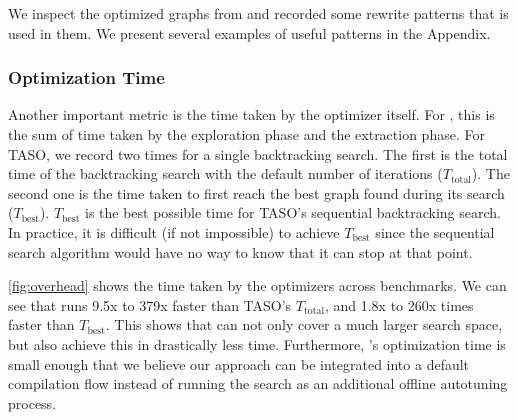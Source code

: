 We inspect the optimized graphs from \ourname{} and recorded some rewrite patterns that is used in them.
We present several examples of useful patterns in the Appendix.

\subsubsection{Optimization Time}
\label{sec:time}

Another important metric is the time taken by the optimizer itself.
For \ourname{}, this is the sum of time taken by the exploration phase and the extraction phase.
For TASO, we record two times for a single backtracking search.
The first is the total time of the backtracking search with the default number of iterations ($T_{\textrm{total}}$).
The second one is the time taken to first reach the best graph found during its search ($T_{\textrm{best}}$).
$T_{\textrm{best}}$ is the best possible time for TASO's sequential backtracking search.
In practice, it is difficult (if not impossible) to achieve $T_{\textrm{best}}$ since the sequential search algorithm would have no way to know that it can stop at that point.

\autoref{fig:overhead} shows the time taken by the optimizers across benchmarks.
We can see that \ourname{} runs 9.5x to 379x faster than TASO's $T_{\textrm{total}}$, and 1.8x to 260x times faster than $T_{\textrm{best}}$.
This shows that \ourname{} can not only cover a much larger search space, but also achieve this in drastically less time.
Furthermore, \ourname{}'s optimization time is small enough that we believe our approach can be integrated into a default compilation flow instead of running the search as an additional offline autotuning process.



